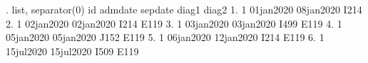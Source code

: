 . list, separator(0)
{\smallskip}
     {\TLC}
     {\VBAR} id     admdate     sepdate   diag1   diag2 {\VBAR}
     {\LFTT}
  1. {\VBAR}  1   01jan2020   08jan2020    I214         {\VBAR}
  2. {\VBAR}  1   02jan2020   02jan2020    I214    E119 {\VBAR}
  3. {\VBAR}  1   03jan2020   03jan2020    I499    E119 {\VBAR}
  4. {\VBAR}  1   05jan2020   05jan2020    J152    E119 {\VBAR}
  5. {\VBAR}  1   06jan2020   12jan2020    I214    E119 {\VBAR}
  6. {\VBAR}  1   15jul2020   15jul2020    I509    E119 {\VBAR}
     {\BLC}
{\smallskip}
